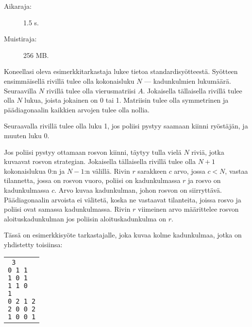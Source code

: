 \documentclass{boi2014-fi}
\begin{document}
    \Constraints
    
    \begin{description}
        \item[Aikaraja:] 1.5 s.
        \item[Muistiraja:] 256 MB.
    \end{description}

    \Experimentation
    Koneellasi oleva esimerkkitarkastaja lukee tietoa standardisyötteestä.
    Syötteen ensimmäisellä rivillä tulee olla kokonaisluku $N$ ---
    kadunkulmien lukumäärä. Seuraavilla $N$ rivillä tulee olla
    vierusmatriisi $A$. Jokaisella tällaisella rivillä tulee olla $N$ lukua,
    joista jokainen on 0 tai 1.
    Matriisin tulee olla symmetrinen ja päädiagonaalin kaikkien arvojen
    tulee olla nollia.

    Seuraavalla rivillä tulee olla luku 1, jos poliisi pystyy saamaan kiinni ryöstäjän,
    ja muuten luku 0.

    Jos poliisi pystyy ottamaan rosvon kiinni, täytyy tulla vielä $N$ riviä,
    jotka kuvaavat rosvon strategian.
    Jokaisella tällaisella rivillä tulee olla $N+1$ kokonaislukua 0:n ja $N-1$:n välillä.
    Rivin $r$ sarakkeen $c$ arvo, jossa $c < N$, vastaa tilannetta,
    jossa on rosvon vuoro, poliisi on kadunkulmassa $r$ ja rosvo on
    kadunkulmassa $c$. Arvo kuvaa kadunkulman, johon rosvon on siirryttävä.
    Päädiagonaalin arvoista ei välitetä, koska ne vastaavat tilanteita,
    joissa rosvo ja poliisi ovat samassa kadunkulmassa.
    Rivin $r$ viimeinen arvo määrittelee rosvon aloituskadunkulman jos poliisin
    aloituskadunkulma on $r$.

    Tässä on esimerkkisyöte tarkastajalle, joka kuvaa kolme kadunkulmaa,
    jotka on yhdistetty toisiinsa:

    \begin{center}
        \begin{tabular}{p{4cm}}
            {\tt
                3 \newline
                0 1 1 \newline
                1 0 1 \newline
                1 1 0 \newline
                1 \newline
                0 2 1 2 \newline
                2 0 0 2 \newline
                1 0 0 1 \newline
            }
        \end{tabular}
    \end{center}
\end{document}
